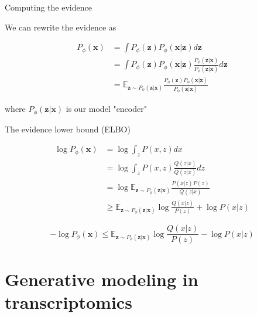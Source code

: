 \documentclass{beamer}					%
\begin{document}
\begin{frame}{Computing the evidence}

We can rewrite the evidence as

\begin{align*}
P_{\phi}(\mathbf{x}) &= \int P_{\phi}(\mathbf{z})P_{\phi}(\mathbf{x|z})d\mathbf{z}\\
&= \int P_{\phi}(\mathbf{z})P_{\phi}(\mathbf{x|z})\frac{P_{\phi}(\mathbf{z|x})}{P_{\phi}(\mathbf{z|x})}d\mathbf{z}\\
&= \mathbb{E}_{\mathbf{z}\sim P_{\phi}(\mathbf{z|x})} \frac{P_{\phi}(\mathbf{z})P_{\phi}(\mathbf{x|z})}{P_{\phi}(\mathbf{z|x})}
\end{align*}

where $P_{\phi}(\mathbf{z|x})$ is our model "encoder"

\end{frame}

\begin{frame}{The evidence lower bound (ELBO)}

\begin{align*}
\log P_{\phi}(\mathbf{x}) &= \log \int_{z}P(x,z)dx\\
&= \log \int_{z} P(x,z)\frac{Q(z|x)}{Q(z|x)}dz\\
&= \log \mathbb{E}_{\mathbf{z}\sim P_{\phi}(\mathbf{z|x})} \frac{P(x|z)P(z)}{Q(z|x)}\\
&\geq \mathbb{E}_{\mathbf{z}\sim P_{\phi}(\mathbf{z|x})} \log \frac{Q(x|z)}{P(z)} + \log P(x|z)
\end{align*}

\begin{equation*}
-\log P_{\phi}(\mathbf{x}) \leq \mathbb{E}_{\mathbf{z}\sim P_{\phi}(\mathbf{z|x})} \log \frac{Q(x|z)}{P(z)} - \log P(x|z)
\end{equation*}


\end{frame}


\section{Generative modeling in transcriptomics}
\end{document}
